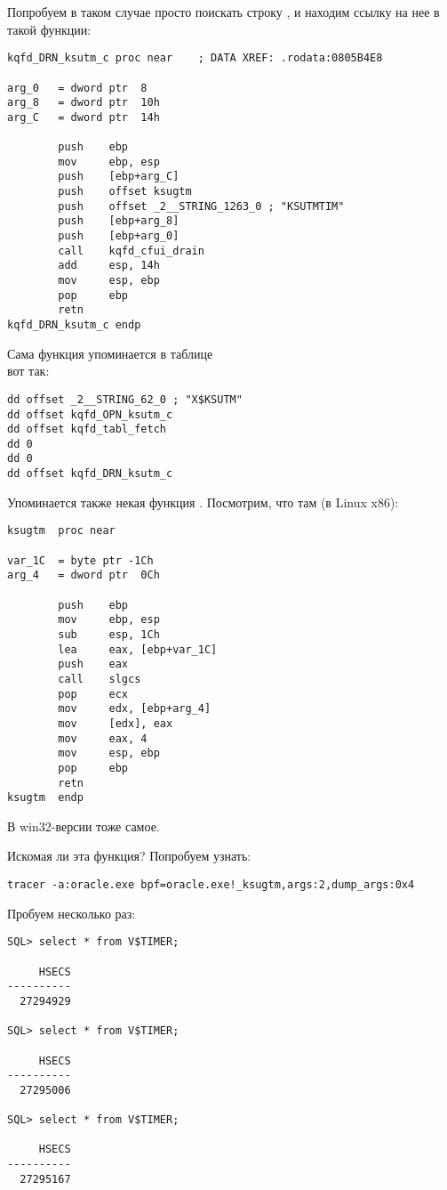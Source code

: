 Попробуем в таком случае просто поискать строку , и находим ссылку на нее в такой функции:

\begin{lstlisting}
kqfd_DRN_ksutm_c proc near    ; DATA XREF: .rodata:0805B4E8

arg_0   = dword ptr  8
arg_8   = dword ptr  10h
arg_C   = dword ptr  14h

        push    ebp
        mov     ebp, esp
        push    [ebp+arg_C]
        push    offset ksugtm
        push    offset _2__STRING_1263_0 ; "KSUTMTIM"
        push    [ebp+arg_8]
        push    [ebp+arg_0]
        call    kqfd_cfui_drain
        add     esp, 14h
        mov     esp, ebp
        pop     ebp
        retn
kqfd_DRN_ksutm_c endp
\end{lstlisting}

Сама функция  упоминается в таблице \\
 вот так:

\begin{lstlisting}
dd offset _2__STRING_62_0 ; "X$KSUTM"
dd offset kqfd_OPN_ksutm_c
dd offset kqfd_tabl_fetch
dd 0
dd 0
dd offset kqfd_DRN_ksutm_c
\end{lstlisting}

Упоминается также некая функция .
Посмотрим, что там (в Linux x86):

\begin{lstlisting}[caption=ksu.o]
ksugtm  proc near

var_1C  = byte ptr -1Ch
arg_4   = dword ptr  0Ch

        push    ebp
        mov     ebp, esp
        sub     esp, 1Ch
        lea     eax, [ebp+var_1C]
        push    eax
        call    slgcs
        pop     ecx
        mov     edx, [ebp+arg_4]
        mov     [edx], eax
        mov     eax, 4
        mov     esp, ebp
        pop     ebp
        retn
ksugtm  endp
\end{lstlisting}

В win32-версии тоже самое.

Искомая ли эта функция? Попробуем узнать:

\begin{lstlisting}
tracer -a:oracle.exe bpf=oracle.exe!_ksugtm,args:2,dump_args:0x4
\end{lstlisting}

Пробуем несколько раз:

\begin{lstlisting}
SQL> select * from V$TIMER;

     HSECS
----------
  27294929

SQL> select * from V$TIMER;

     HSECS
----------
  27295006

SQL> select * from V$TIMER;

     HSECS
----------
  27295167
\end{lstlisting}

